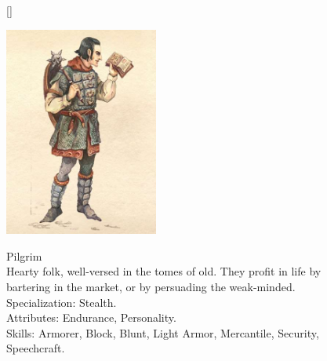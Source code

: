 \documentclass[12pt]{book}
\begin{document}
\begin{figure}[H]
[\FBwidth]
{\caption*{Pilgrim\\

Hearty folk, well-versed in the tomes of old. They profit in life by bartering in the market, or by persuading the weak-minded.\\

Specialization: Stealth.\\

Attributes: Endurance, Personality.\\

Skills: Armorer, Block, Blunt, Light Armor, Mercantile, Security, Speechcraft.}\label{fig:test}}
{\includegraphics[width=0.45\textwidth]{Pilgrim.png}}
\end{figure}
\end{document}
